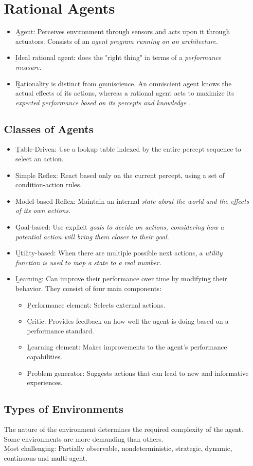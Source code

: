 \section{Rational Agents}
\begin{itemize}
     \item \b{Agent}: Perceives environment through sensors and acts upon it through actuators. Consists of an \it{agent program} running on an \it{architecture}.
     \item \b{Ideal rational agent}: does the "right thing" in terms of a \it{performance measure}.
     \item \b{Rationality} is distinct from \b{omniscience}. An omniscient agent knows the actual effects of its actions, whereas a rational agent acts to maximize its \it{expected} performance based on its percepts and knowledge .
\end{itemize}

\subsection{Classes of Agents}
\begin{itemize}
     \item \b{Table-Driven:} Use a lookup table indexed by the entire percept sequence to select an action.
     \item \b{Simple Reflex:} React based only on the current percept, using a set of condition-action rules.
     \item \b{Model-based Reflex:} Maintain an internal \it{state} about the world and the effects of its own actions.
     \item \b{Goal-based:} Use explicit \it{goals} to decide on actions, considering how a potential action will bring them closer to their goal.
     \item \b{Utility-based:} When there are multiple possible next actions, a \it{utility function} is used to map a state to a real number.
     \item \b{Learning:} Can improve their performance over time by modifying their behavior. They consist of four main components:
    \begin{itemize}
         \item \b{Performance element:} Selects external actions.
         \item \b{Critic:} Provides feedback on how well the agent is doing based on a performance standard.
         \item \b{Learning element:} Makes improvements to the agent's performance capabilities.
         \item \b{Problem generator:} Suggests actions that can lead to new and informative experiences.
    \end{itemize}
\end{itemize}

\subsection{Types of Environments}
The nature of the environment determines the required complexity of the agent. Some environments are more demanding than others.\\[0.5em]
\b{Most challenging}: Partially observable, nondeterministic, strategic, dynamic, continuous and multi-agent.